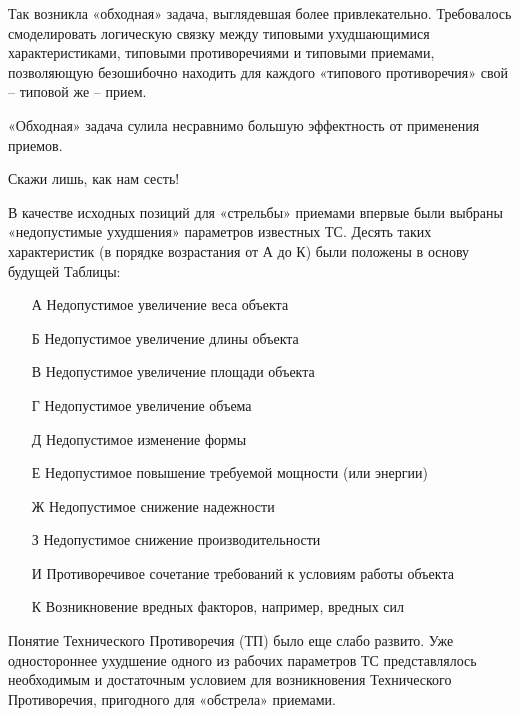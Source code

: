 \documentclass[11pt,a4paper]{article}
\begin{document}
Так возникла «обходная» задача, выглядевшая более привлекательно. Требовалось
смоделировать логическую связку между типовыми ухудшающимися характеристиками,
типовыми противоречиями и типовыми приемами, позволяющую безошибочно находить
для каждого «типового противоречия» свой -- типовой же -- прием.

«Обходная» задача сулила несравнимо большую эффектность от применения приемов.

Скажи лишь, как нам сесть!

В качестве исходных позиций для «стрельбы» приемами впервые были выбраны
«недопустимые ухудшения» параметров известных ТС. Десять таких характеристик
(в порядке возрастания от А до К) были положены в основу будущей Таблицы:
\begin{itemize}
\item[А] Недопустимое увеличение веса объекта
\item[Б] Недопустимое увеличение длины объекта
\item[В] Недопустимое увеличение площади объекта
\item[Г] Недопустимое увеличение объема
\item[Д] Недопустимое изменение формы
\item[Е] Недопустимое повышение требуемой мощности (или энергии)
\item[Ж] Недопустимое снижение надежности
\item[З] Недопустимое снижение производительности
\item[И] Противоречивое сочетание требований к условиям работы объекта
\item[К] Возникновение вредных факторов, например, вредных сил
\end{itemize}
Понятие Технического Противоречия (ТП) было еще слабо развито. Уже
одностороннее ухудшение одного из рабочих параметров ТС представлялось
необходимым и достаточным условием для возникновения Технического
Противоречия, пригодного для «обстрела» приемами.
\end{document}
